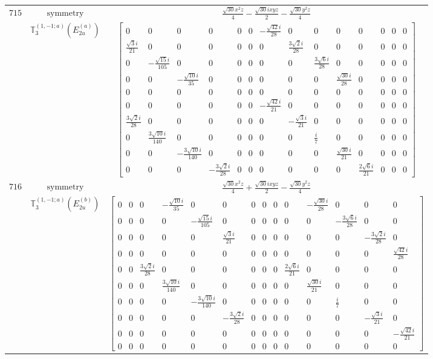 \documentclass[fleqn,8pt,landscape]{jsarticle}
\begin{document}
\begin{longtable}{ccc}
$ 715 $ & $ \text{symmetry} $ & $ \frac{\sqrt{30} x^{2} z}{4} - \frac{\sqrt{30} i x y z}{2} - \frac{\sqrt{30} y^{2} z}{4} $ \\
$  $ & $ \mathbb{T}_{3}^{(1,-1;a)}(E_{2u}^{(a)}) $ & $ \begin{bmatrix} 0 & 0 & 0 & 0 & 0 & 0 & - \frac{\sqrt{42} i}{28} & 0 & 0 & 0 & 0 & 0 & 0 & 0 \\ \frac{\sqrt{3} i}{21} & 0 & 0 & 0 & 0 & 0 & 0 & \frac{3 \sqrt{2} i}{28} & 0 & 0 & 0 & 0 & 0 & 0 \\ 0 & - \frac{\sqrt{15} i}{105} & 0 & 0 & 0 & 0 & 0 & 0 & \frac{3 \sqrt{6} i}{28} & 0 & 0 & 0 & 0 & 0 \\ 0 & 0 & - \frac{\sqrt{10} i}{35} & 0 & 0 & 0 & 0 & 0 & 0 & \frac{\sqrt{30} i}{28} & 0 & 0 & 0 & 0 \\ 0 & 0 & 0 & 0 & 0 & 0 & 0 & 0 & 0 & 0 & 0 & 0 & 0 & 0 \\ 0 & 0 & 0 & 0 & 0 & 0 & - \frac{\sqrt{42} i}{21} & 0 & 0 & 0 & 0 & 0 & 0 & 0 \\ \frac{3 \sqrt{2} i}{28} & 0 & 0 & 0 & 0 & 0 & 0 & - \frac{\sqrt{3} i}{21} & 0 & 0 & 0 & 0 & 0 & 0 \\ 0 & \frac{3 \sqrt{10} i}{140} & 0 & 0 & 0 & 0 & 0 & 0 & \frac{i}{7} & 0 & 0 & 0 & 0 & 0 \\ 0 & 0 & - \frac{3 \sqrt{10} i}{140} & 0 & 0 & 0 & 0 & 0 & 0 & \frac{\sqrt{30} i}{21} & 0 & 0 & 0 & 0 \\ 0 & 0 & 0 & - \frac{3 \sqrt{2} i}{28} & 0 & 0 & 0 & 0 & 0 & 0 & \frac{2 \sqrt{6} i}{21} & 0 & 0 & 0 \end{bmatrix} $ \\ \hline
$ 716 $ & $ \text{symmetry} $ & $ \frac{\sqrt{30} x^{2} z}{4} + \frac{\sqrt{30} i x y z}{2} - \frac{\sqrt{30} y^{2} z}{4} $ \\
$  $ & $ \mathbb{T}_{3}^{(1,-1;a)}(E_{2u}^{(b)}) $ & $ \begin{bmatrix} 0 & 0 & 0 & - \frac{\sqrt{10} i}{35} & 0 & 0 & 0 & 0 & 0 & 0 & - \frac{\sqrt{30} i}{28} & 0 & 0 & 0 \\ 0 & 0 & 0 & 0 & - \frac{\sqrt{15} i}{105} & 0 & 0 & 0 & 0 & 0 & 0 & - \frac{3 \sqrt{6} i}{28} & 0 & 0 \\ 0 & 0 & 0 & 0 & 0 & \frac{\sqrt{3} i}{21} & 0 & 0 & 0 & 0 & 0 & 0 & - \frac{3 \sqrt{2} i}{28} & 0 \\ 0 & 0 & 0 & 0 & 0 & 0 & 0 & 0 & 0 & 0 & 0 & 0 & 0 & \frac{\sqrt{42} i}{28} \\ 0 & 0 & \frac{3 \sqrt{2} i}{28} & 0 & 0 & 0 & 0 & 0 & 0 & \frac{2 \sqrt{6} i}{21} & 0 & 0 & 0 & 0 \\ 0 & 0 & 0 & \frac{3 \sqrt{10} i}{140} & 0 & 0 & 0 & 0 & 0 & 0 & \frac{\sqrt{30} i}{21} & 0 & 0 & 0 \\ 0 & 0 & 0 & 0 & - \frac{3 \sqrt{10} i}{140} & 0 & 0 & 0 & 0 & 0 & 0 & \frac{i}{7} & 0 & 0 \\ 0 & 0 & 0 & 0 & 0 & - \frac{3 \sqrt{2} i}{28} & 0 & 0 & 0 & 0 & 0 & 0 & - \frac{\sqrt{3} i}{21} & 0 \\ 0 & 0 & 0 & 0 & 0 & 0 & 0 & 0 & 0 & 0 & 0 & 0 & 0 & - \frac{\sqrt{42} i}{21} \\ 0 & 0 & 0 & 0 & 0 & 0 & 0 & 0 & 0 & 0 & 0 & 0 & 0 & 0 \end{bmatrix} $ \\ \hline

\end{longtable}
\end{document}
